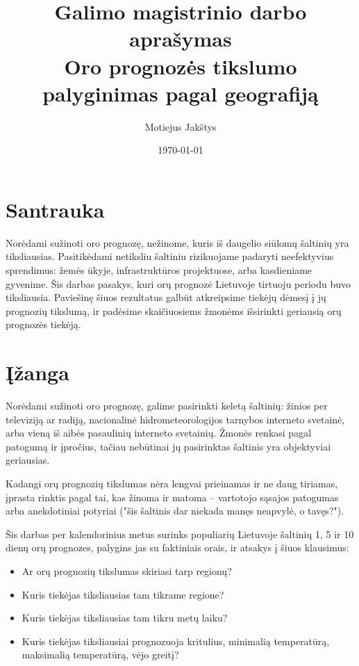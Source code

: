 \documentclass{article}
\title{Galimo magistrinio darbo aprašymas\\ \vspace{4mm} 
Oro prognozės tikslumo palyginimas pagal geografiją}
\author{Motiejus Jakštys}
\date{\today}
\begin{document}
\maketitle

\section{Santrauka}

Norėdami sužinoti oro prognozę, nežinome, kuris iš daugelio siūlomų šaltinių
yra tiksliausias. Pasitikėdami netiksliu šaltiniu rizikuojame padaryti
neefektyvius sprendimus: žemės ūkyje, infrastruktūros projektuose, arba
kasdieniame gyvenime. Šis darbas pasakys, kuri orų prognozė Lietuvoje tirtuoju
periodu buvo tiksliausia. Paviešinę šiuos rezultatus galbūt atkreipsime tiekėjų
dėmesį į jų prognozių tikslumą, ir padėsime skaičiuosiems žmonėms išsirinkti
geriausią orų prognozės tiekėją.

\section{Įžanga}

Norėdami sužinoti oro prognozę, galime pasirinkti keletą šaltinių: žinios per
televiziją ar radiją, nacionalinė hidrometeorologijos tarnybos interneto
svetainė, arba vieną iš aibės pasaulinių interneto svetainių. Žmonės renkasi
pagal patogumą ir įpročius, tačiau nebūtinai jų pasirinktas šaltinis yra
objektyviai geriausias.

Kadangi orų prognozių tikslumas nėra lengvai prieinamas ir ne daug tiriamas,
įprasta rinktis pagal tai, kas žinoma ir matoma -- vartotojo sąsajos patogumas
arba anekdotiniai potyriai ("šis šaltinis dar niekada manęs neapvylė, o
tavęs?").

Šis darbas per kalendorinius metus surinks populiarių Lietuvoje šaltinių 1, 5
ir 10 dienų orų prognozes, palygins jas su faktiniais orais, ir atsakys į šiuos
klausimus:

\begin{itemize}
    \item Ar orų prognozių tikslumas skiriasi tarp regionų?
    \item Kuris tiekėjas tiksliausias tam tikrame regione?
    \item Kuris tiekėjas tiksliausias tam tikru metų laiku?
    \item Kuris tiekėjas tiksliausiai prognozuoja kritulius, minimalią
        temperatūrą, maksimalią temperatūrą, vėjo greitį?
\end{itemize}
\end{document}
